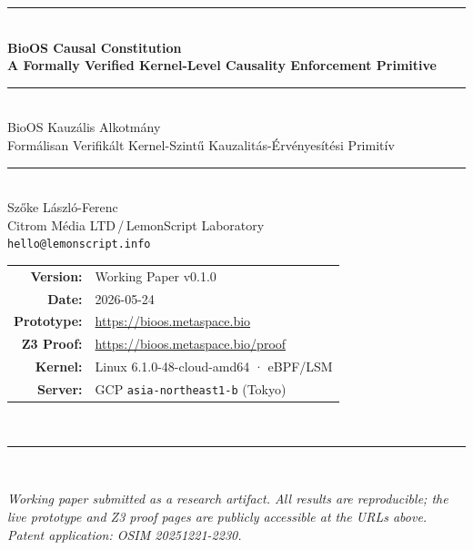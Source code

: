 \documentclass[11pt,a4paper,twoside]{article}
\newcommand{\bioURL}{\url{https://bioos.metaspace.bio}}
\newcommand{\proofURL}{\url{https://bioos.metaspace.bio/proof}}
\begin{document}

\begin{titlepage}
\begin{center}
  \vspace*{1.5cm}
  {\color{bioblue}\rule{\linewidth}{2pt}}\\[10pt]
  {\LARGE\bfseries\color{bioblue} BioOS Causal Constitution}\\[6pt]
  {\large\bfseries A Formally Verified Kernel-Level Causality Enforcement Primitive}\\[12pt]
  {\color{biogray}\rule{\linewidth}{0.5pt}}\\[8pt]
  {\large\color{biogray} BioOS Kauzális Alkotmány}\\[4pt]
  {\normalsize\color{biogray} Formálisan Verifikált Kernel-Szintű Kauzalitás-Érvényesítési Primitív}\\[14pt]
  {\color{bioblue}\rule{\linewidth}{0.5pt}}\\[22pt]
  {\large Szőke László-Ferenc}\\[4pt]
  {\normalsize Citrom Média LTD\,/\,LemonScript Laboratory}\\[2pt]
  {\small\texttt{hello@lemonscript.info}}\\[18pt]
  \begin{tabular}{rl}
    \textbf{Version:}   & Working Paper v0.1.0 \\
    \textbf{Date:}      & 2026-05-24 \\
    \textbf{Prototype:} & \bioURL \\
    \textbf{Z3 Proof:}  & \proofURL \\
    \textbf{Kernel:}    & Linux 6.1.0-48-cloud-amd64 · eBPF/LSM \\
    \textbf{Server:}    & GCP \texttt{asia-northeast1-b} (Tokyo) \\
  \end{tabular}\\[24pt]
  {\color{bioblue}\rule{\linewidth}{2pt}}\\[16pt]
  \begin{minipage}{0.9\linewidth}
    \small\itshape\color{biogray}
    Working paper submitted as a research artifact.
    All results are reproducible; the live prototype and Z3 proof pages
    are publicly accessible at the URLs above.
    Patent application: OSIM 20251221-2230.
  \end{minipage}
\end{center}
\end{titlepage}
\end{document}
